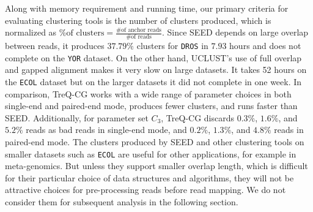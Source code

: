 \documentclass[a4paper]{article}
\begin{document}
Along with memory requirement and running time, our primary criteria for
evaluating clustering tools is the number of clusters produced, which
is normalized as $\mbox{\% of clusters} = \frac{\mbox{\# of anchor reads}}{\mbox{\# of reads}}$.
Since SEED depends on large overlap between reads, it produces $37.79\%$
clusters for {\tt DROS} in $7.93$ hours and does not complete on the
{\tt YOR} dataset. On the other hand, UCLUST's use of full overlap
and gapped alignment makes it very slow on large datasets.
It takes 52 hours on the {\tt ECOL} dataset but on the larger datasets
it did not complete in one week. In comparison,
TreQ-CG
works with a wide
range of parameter choices in both single-end and paired-end mode,
produces fewer clusters, and runs faster than SEED.
Additionally, for parameter set $C_3$, TreQ-CG discards
$0.3\%$, $1.6\%$, and
$5.2\%$ reads as bad reads in single-end mode, and $0.2\%$, $1.3\%$, and
$4.8\%$ reads in paired-end mode.
The clusters
produced by SEED and other clustering tools on smaller datasets such as
{\tt ECOL} are useful for other applications, for example in meta-genomics.
But unless they support smaller overlap length, which is difficult for their
particular choice of data structures and algorithms, they will not be
attractive choices for pre-processing reads before read mapping.
We do not consider them for subsequent analysis in the following section.
\end{document}
